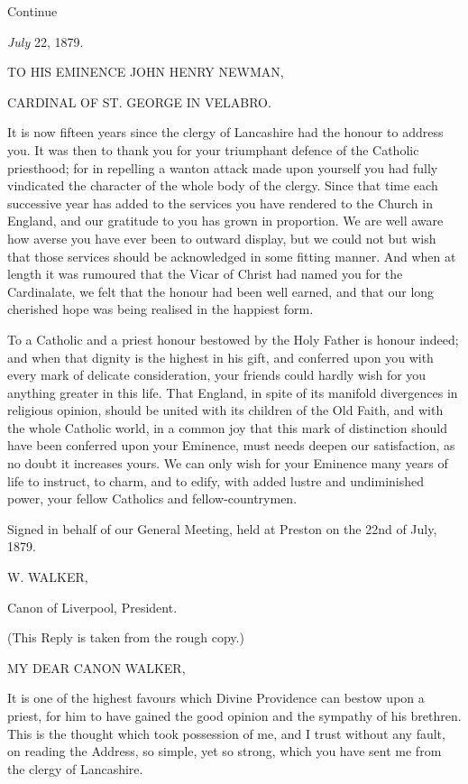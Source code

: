 Continue


\emph{July} 22, 1879.

TO HIS EMINENCE
JOHN HENRY NEWMAN,

CARDINAL OF ST.
GEORGE IN VELABRO.

It is now fifteen years since the clergy of Lancashire had the honour
to address you. It was then to thank you for your triumphant defence
of the Catholic priesthood; for in repelling a wanton attack
made upon yourself you had fully vindicated the character of the whole
body of the clergy. Since that time each successive year has added to
the services you have rendered to the Church in England, and our
gratitude to you has grown in proportion. We are well aware how averse
you have ever been to outward display, but we could not but wish that
those services should be acknowledged in some fitting manner. And when
at length it was rumoured that the Vicar of Christ had named you for
the Cardinalate, we felt that the honour had been well earned, and
that our long cherished hope was being realised in the happiest form.

To a Catholic and a priest honour bestowed by the Holy Father is
honour indeed; and when that dignity is the highest in his gift, and
conferred upon you with every mark of delicate consideration, your
friends could hardly wish for you anything greater in this life. That
England, in spite of its manifold divergences in religious opinion,
should be united with its children of the Old Faith, and with the
whole Catholic world, in a common joy that this mark of distinction
should have been conferred upon your Eminence, must needs deepen our
satisfaction, as no doubt it increases yours. We can only wish for
your Eminence many years of life to instruct, to charm, and to edify,
with added lustre and undiminished power, your fellow Catholics
and fellow-countrymen.

Signed in behalf of our General Meeting, held at Preston on the
22nd of July, 1879.

W. WALKER,

Canon of Liverpool, President.


(This Reply is taken from the rough copy.)

MY DEAR CANON
WALKER,

It is one of the highest favours which Divine Providence can bestow
upon a priest, for him to have gained the good opinion and the
sympathy of his brethren. This is the thought which took possession of
me, and I trust without any fault, on reading the Address, so simple,
yet so strong, which you have sent me from the clergy of Lancashire.

